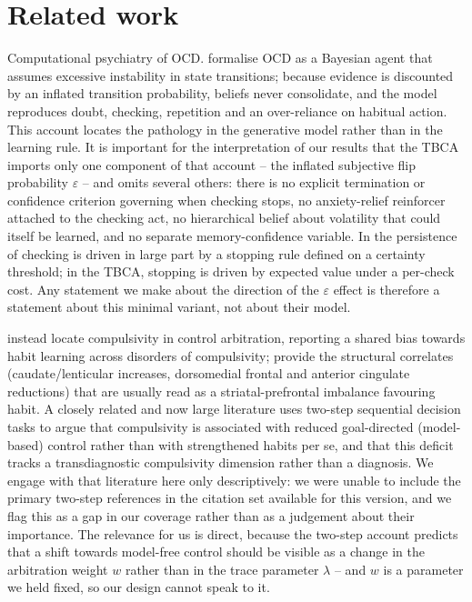 \documentclass[11pt,a4paper]{article}
\begin{document}
\section{Related work}
Computational psychiatry of OCD. \citet{fradkin2020searching} formalise OCD as a Bayesian agent that assumes excessive instability in state transitions; because evidence is discounted by an inflated transition probability, beliefs never consolidate, and the model reproduces doubt, checking, repetition and an over-reliance on habitual action. This account locates the pathology in the generative model rather than in the learning rule. It is important for the interpretation of our results that the TBCA imports only one component of that account -- the inflated subjective flip probability $\varepsilon$ -- and omits several others: there is no explicit termination or confidence criterion governing when checking stops, no anxiety-relief reinforcer attached to the checking act, no hierarchical belief about volatility that could itself be learned, and no separate memory-confidence variable. In \citet{fradkin2020searching} the persistence of checking is driven in large part by a stopping rule defined on a certainty threshold; in the TBCA, stopping is driven by expected value under a per-check cost. Any statement we make about the direction of the $\varepsilon$ effect is therefore a statement about this minimal variant, not about their model.

\citet{voon2014disorders} instead locate compulsivity in control arbitration, reporting a shared bias towards habit learning across disorders of compulsivity; \citet{radua2009voxelwise} provide the structural correlates (caudate/lenticular increases, dorsomedial frontal and anterior cingulate reductions) that are usually read as a striatal-prefrontal imbalance favouring habit. A closely related and now large literature uses two-step sequential decision tasks to argue that compulsivity is associated with reduced goal-directed (model-based) control rather than with strengthened habits per se, and that this deficit tracks a transdiagnostic compulsivity dimension rather than a diagnosis. We engage with that literature here only descriptively: we were unable to include the primary two-step references in the citation set available for this version, and we flag this as a gap in our coverage rather than as a judgement about their importance. The relevance for us is direct, because the two-step account predicts that a shift towards model-free control should be visible as a change in the arbitration weight $w$ rather than in the trace parameter $\lambda$ -- and $w$ is a parameter we held fixed, so our design cannot speak to it.
\end{document}
